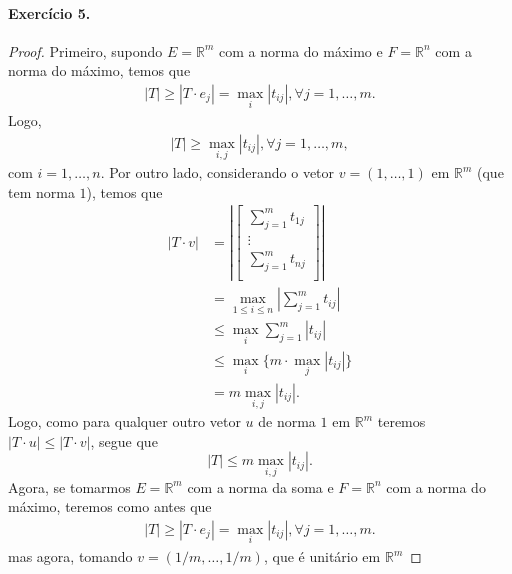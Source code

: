 \documentclass[12pt,a4paper]{article}
\newcommand{\R}{\mathbb{R}}
\begin{document}
\paragraph{Exercício 5.}
    \begin{proof}
        Primeiro, supondo $E = \R^m$ com a norma do máximo e $F = \R^n$ com
        a norma do máximo, temos que
        \begin{align*}
            |T| \geq |T\cdot e_j| = \max_i |t_{ij}|, \forall j = 1, \dots, m.
        \end{align*}
        Logo,
        \begin{align*}
            |T| \geq \max_{i,j} |t_{ij}|, \forall j = 1, \dots, m,
        \end{align*}
        com $i = 1, \dots, n$. Por outro lado, considerando o vetor $v = (1,\dots,1)$
        em $\R^m$ (que tem norma $1$), temos que
        \begin{align*}
            |T \cdot v|
            &= \left|\begin{bmatrix}
                \displaystyle{\sum_{j=1}^m t_{1j}} \\
                \vdots \\
                \displaystyle{\sum_{j=1}^m t_{nj}} \\
            \end{bmatrix}\right| \\
            &= \max_{1\leq i\leq n} \left| \displaystyle{\sum_{j=1}^m t_{ij}} \right| \\
            &\leq \max_i \displaystyle{\sum_{j=1}^m |t_{ij}|} \\
            &\leq \max_i \{m\cdot\max_j |t_{ij}|\} \\
            &= m\max_{i,j} |t_{ij}|.
        \end{align*}
        Logo, como para qualquer outro vetor $u$ de norma $1$ em $\R^m$ teremos
        $|T\cdot u| \leq |T\cdot v|$, segue que
        \begin{equation*}
            |T| \leq m \max_{i,j}|t_{ij}|.
        \end{equation*}
        Agora, se tomarmos $E = \R^m$ com a norma da soma e $F = \R^n$ com
        a norma do máximo, teremos como antes que
        \begin{align*}
            |T| \geq |T\cdot e_j| = \max_i |t_{ij}|, \forall j = 1, \dots, m.
        \end{align*}
        mas agora, tomando $v = (1/m, \dots, 1/m)$, que é unitário em $\R^m$ 

\end{proof}
\end{document}
